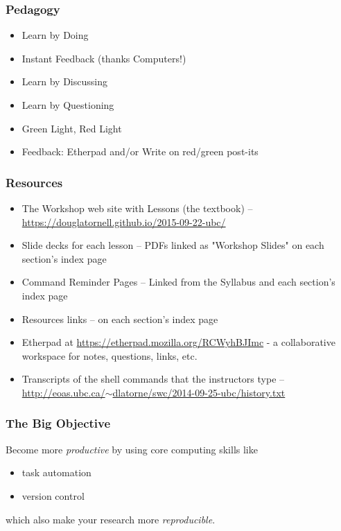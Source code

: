 \documentclass{beamer}
\begin{document}
\begin{frame}
  \frametitle{Pedagogy}
  \begin{itemize}
    \item Learn by Doing
    \item Instant Feedback (thanks Computers!)
    \item Learn by Discussing
    \item Learn by Questioning
    \item Green Light, Red Light
    \item Feedback: Etherpad and/or Write on red/green post-its
  \end{itemize}
\end{frame}


\begin{frame}
  \frametitle{Resources}
  \begin{itemize}
    \item The Workshop web site with Lessons (the textbook) -- \href{https://douglatornell.github.io/2015-09-22-ubc/}{https://douglatornell.github.io/2015-09-22-ubc/}
    \item Slide decks for each lesson -- PDFs linked as "Workshop Slides" on each section's index page
    \item Command Reminder Pages -- Linked from the Syllabus and each section's index page
    \item Resources links -- on each section's index page
    \item Etherpad at \href{https://etherpad.mozilla.org/RCWyhBJImc}{https://etherpad.mozilla.org/RCWyhBJImc} - a collaborative workspace for notes, questions, links, etc.
    \item Transcripts of the shell commands that the instructors type -- \href{http://eoas.ubc.ca/~dlatorne/swc/2014-09-25-ubc/history.txt}{http://eoas.ubc.ca/$\sim$dlatorne/swc/2014-09-25-ubc/history.txt}
  \end{itemize}
\end{frame}


\begin{frame}
  \frametitle{The Big Objective}
  Become more {\em productive} by using core computing skills like
  \begin{itemize}
    \item task automation
    \item version control
  \end{itemize}
  which also make your research more {\em reproducible}.
\end{frame}
\end{document}
